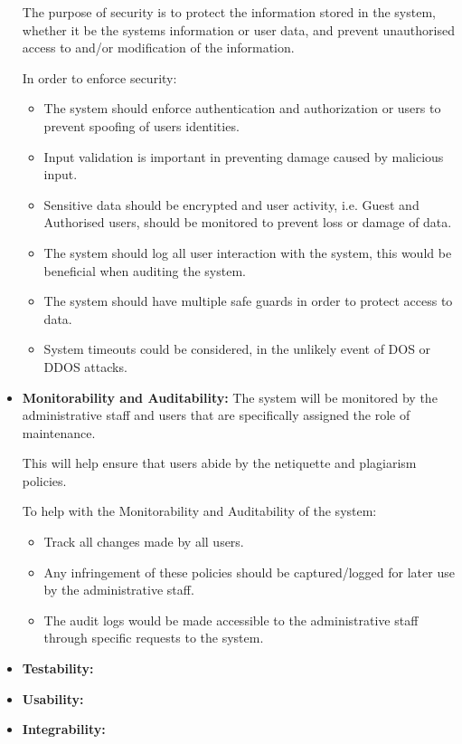 \begin{flushleft}
\begin{itemize}
The purpose of security is to protect the information stored in the system, whether it be the systems information or user data, and prevent unauthorised access to and/or modification of the information.
\newline

In order to enforce security:
\begin{itemize}
 \item The system should enforce authentication and authorization or users to prevent spoofing of users identities.
 \item Input validation is important in preventing damage caused by malicious input.
 \item Sensitive data should be encrypted and user activity, i.e. Guest and Authorised users, should be monitored to prevent loss or damage of data.
 \item The system should log all user interaction with the system, this would be beneficial when auditing the system.
 \item The system should have multiple safe guards in order to protect access to data.
 \item System timeouts could be considered, in the unlikely event of DOS or DDOS attacks.
\end{itemize}
 
		\item \textbf{Monitorability and Auditability:} 
The system will be monitored by the administrative staff and users that are specifically assigned the role of maintenance. \newline

This will help ensure that users abide by the netiquette and plagiarism policies.  \newline

To help with the Monitorability and Auditability of the system:
\begin{itemize}
\item Track all changes made by all users. 
\item Any infringement of these policies should be captured/logged for later use by the administrative staff.
\item The audit logs would be made accessible to the administrative staff through specific requests to the system. 
\end{itemize}


			
		\item \textbf{Testability:} 
		\item \textbf{Usability:} 
		\item \textbf{Integrability:} 
	\end{itemize}
	
\end{flushleft}

